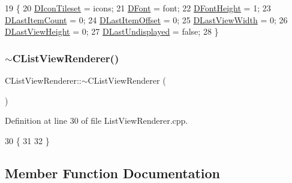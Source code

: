 \begin{DoxyCode}
19                                                                                                            
         \{
20     \hyperlink{classCListViewRenderer_af6e36f127e551dd54c01f8df0fadeb9c}{DIconTileset} = icons;
21     \hyperlink{classCListViewRenderer_a1fc512e6dd37dba02b6e6fa5800ef222}{DFont} = font;
22     \hyperlink{classCListViewRenderer_a4d5e792e525ca2df01f0300bfe1248af}{DFontHeight} = 1;
23     \hyperlink{classCListViewRenderer_a087155c29c7ac3a830f6645af590ed94}{DLastItemCount} = 0;
24     \hyperlink{classCListViewRenderer_ad6b2b0052b8f74e3198fbfb39900b4e3}{DLastItemOffset} = 0;
25     \hyperlink{classCListViewRenderer_ad88d5d0b8209dd9ae1cf726f99339640}{DLastViewWidth} = 0;
26     \hyperlink{classCListViewRenderer_a7f74a3883638efee557cde501d47ee70}{DLastViewHeight} = 0;
27     \hyperlink{classCListViewRenderer_ad08a63dfe697395050c5af2ce4479aa2}{DLastUndisplayed} = \textcolor{keyword}{false};
28 \}
\end{DoxyCode}
\hypertarget{classCListViewRenderer_a7faaf42f2cb2c2898e8f52c49d33d92a}{}\label{classCListViewRenderer_a7faaf42f2cb2c2898e8f52c49d33d92a} 
\subsubsection{\texorpdfstring{$\sim$\+C\+List\+View\+Renderer()}{~CListViewRenderer()}}
{\footnotesize\ttfamily C\+List\+View\+Renderer\+::$\sim$\+C\+List\+View\+Renderer (\begin{DoxyParamCaption}{ }\end{DoxyParamCaption})}



Definition at line 30 of file List\+View\+Renderer.\+cpp.


\begin{DoxyCode}
30                                      \{
31     
32 \}
\end{DoxyCode}


\subsection{Member Function Documentation}
\hypertarget{classCListViewRenderer_a870a37b08daedfab617bae1ff705a919}{}\label{classCListViewRenderer_a870a37b08daedfab617bae1ff705a919} 
